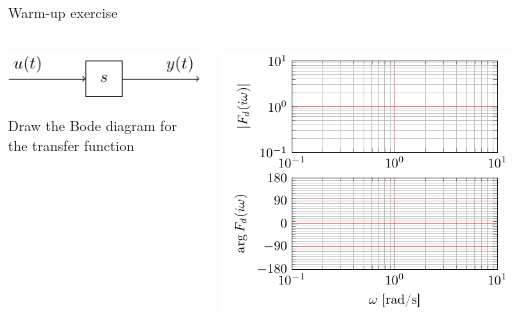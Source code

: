 \documentclass[presentation,aspectratio=1610]{beamer}
\begin{document}
\begin{frame}[label={sec:org31a75f1}]{Warm-up exercise}
\begin{columns}
\begin{column}{0.4\columnwidth}
\begin{center}
\includegraphics[width=\linewidth]{../../figures/block-simple-derivative}
\end{center}

\alert{Draw the Bode diagram for the transfer function}
\end{column}
\begin{column}{0.6\columnwidth}
\begin{center}
\includegraphics[width=\linewidth]{../../figures/bode-derivative-empty}
\end{center}
\end{column}
\end{columns}
\end{frame}
\end{document}
